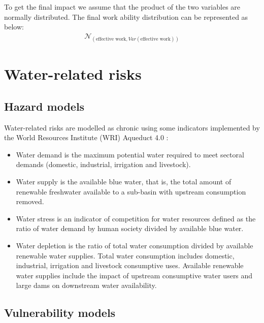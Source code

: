 \documentclass[a4paper,11pt]{extarticle} %
\theoremstyle{definition}
\begin{document}
To get the final impact we assume that the product of the two variables are normally distributed. The final work ability distribution can be represented as below:
\begin{equation}
\begin{aligned}
    \label{Eq:Final_Result_Heat}
     \mathcal{N}_{\left(\text{effective work}, Var\left(\text{effective work}\right)\right)}
      \end{aligned}
\end{equation}
\setcounter{secnumdepth}{3}

\section{Water-related risks}
\subsection{Hazard models}
Water-related risks are modelled as chronic using some indicators implemented by the World Resources Institute (WRI) Aqueduct 4.0 \cite{KuzmaEtAl:2023}:
\begin{itemize}
\item Water demand is the maximum potential water required to meet sectoral demands (domestic, industrial, irrigation and livestock).
\item Water supply is the available blue water, that is, the total amount of renewable freshwater available to a sub-basin with upstream consumption removed.
\item Water stress is an indicator of competition for water resources defined as the ratio of water demand by human society divided by available blue water.
\item Water depletion is the ratio of total water consumption divided by available renewable water supplies. Total water consumption includes domestic, industrial, irrigation and livestock consumptive uses. Available renewable water supplies include the impact of upstream consumptive water users and large dams on downstream water availability.
\end{itemize}
\subsection{Vulnerability models}
\end{document}
